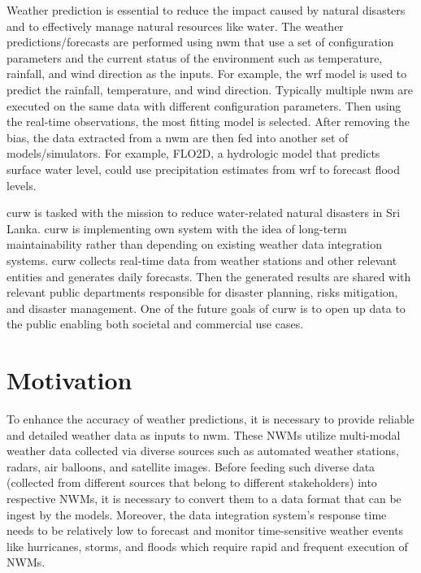 Weather prediction is essential to reduce the impact caused by natural disasters and to effectively manage natural resources like water. 
The weather predictions/forecasts are performed using \acrfull{nwm} that use a set of configuration parameters and the current status of the environment such as temperature, rainfall, and wind direction as the inputs. For example, the \acrfull{wrf} \cite{MesoscaleMicroscaleMeteorologyLaboratoryWeatherModel} model is used to predict the rainfall, temperature, and wind direction. Typically multiple \acrshort{nwm} are executed on the same data with different configuration parameters. Then using the real-time observations, the most fitting model is selected. After removing the bias, the data extracted from a \acrshort{nwm} are then fed into another set of models/simulators. For example, FLO2D, a hydrologic model that predicts surface water level, could use precipitation estimates from \acrshort{wrf} to forecast flood levels.

\acrfull{curw} \cite{CUrWSL2017SL} is tasked with the mission to reduce water-related natural disasters in Sri Lanka. \acrshort{curw} \cite{CUrWSLObservedSL} is implementing own system with the idea of long-term maintainability rather than depending on existing weather data integration systems. \acrshort{curw} collects real-time data from weather stations and other relevant entities and generates daily forecasts. Then the generated results are shared with relevant public departments responsible for disaster planning, risks mitigation, and disaster management. One of the future goals of \acrshort{curw} is to open up data to the public enabling both societal and commercial use cases.


\section{Motivation}
To enhance the accuracy of weather predictions, it is necessary to provide reliable and detailed weather data as inputs to \acrshort{nwm}. These NWMs utilize multi-modal weather data collected via diverse sources such as automated weather stations, radars, air balloons, and satellite images. Before feeding such diverse data (collected from different sources that belong to different stakeholders) into respective NWMs, it is necessary to convert them to a data format that can be ingest by the models. Moreover, the data integration system's response time needs to be relatively low to forecast and monitor time-sensitive weather events like hurricanes, storms, and floods which require rapid and frequent execution of NWMs.

